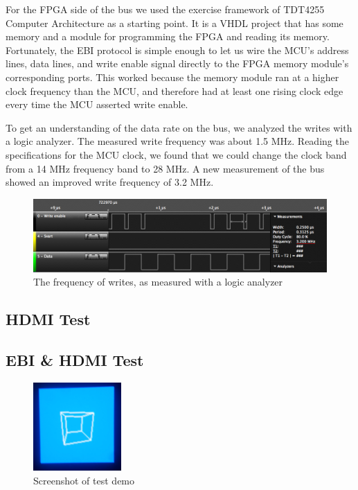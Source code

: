 \documentclass[../main/report.tex]{subfiles}
\begin{document}
For the FPGA side of the bus we used the exercise framework of TDT4255 Computer Architecture as a starting point.
It is a VHDL project that has some memory and a module for programming the FPGA and reading its memory.
Fortunately, the EBI protocol is simple enough to let us wire the MCU's address lines, data lines, and write enable signal directly to the FPGA memory module's corresponding ports.
This worked because the memory module ran at a higher clock frequency than the MCU, and therefore had at least one rising clock edge every time the MCU asserted write enable.

To get an understanding of the data rate on the bus, we analyzed the writes with a logic analyzer.
The measured write frequency was about 1.5 MHz.
Reading the specifications for the MCU clock, we found that we could change the clock band from a 14 MHz frequency band to 28 MHz.
A new measurement of the bus showed an improved write frequency of 3.2 MHz.

\begin{figure}[htp]
\centering
\includegraphics[width=\textwidth]{../diagrams/ebi_bus_write_speed.png}
\caption{The frequency of writes, as measured with a logic analyzer}
\label{ebi_bis_write_speed}
\end{figure}

\subsection{HDMI Test}

\subsection{EBI \& HDMI Test}

\begin{figure}
\centering
\includegraphics[width=0.3\textwidth]{../diagrams/prototype_demo.png}
\caption{Screenshot of test demo}
\label{prototype_demo}
\end{figure}
\end{document}
